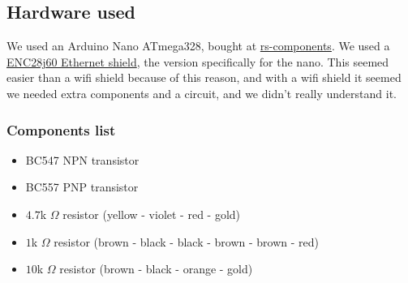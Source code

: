 \subsection{Hardware used}\label{subsec:hardwareUsed}
We used an Arduino Nano ATmega328, bought at \href{http://nl.rs-online.com/}{rs-components}.
We used a \href{http://www.mijn-gadgets.nl/Webwinkel-Product-157562595/ENC28J60-Ethernet-Shield-Network-Module-V1.0-For-Arduino-Nano.html}{ENC28j60 Ethernet shield}, the version specifically for the nano.
This seemed easier than a wifi shield because of this reason, and with a wifi shield it seemed we needed extra components and a circuit, and we didn't really understand it.
\subsubsection{Components list}
	\begin{itemize}
		\item BC547 NPN transistor
		\item BC557 PNP transistor
		\item $4.7$k $\Omega$ resistor (yellow - violet - red - gold)
		\item $1$k $\Omega$ resistor (brown - black - black - brown - brown - red)
		\item $10$k $\Omega$ resistor (brown - black - orange - gold)
	\end{itemize}
